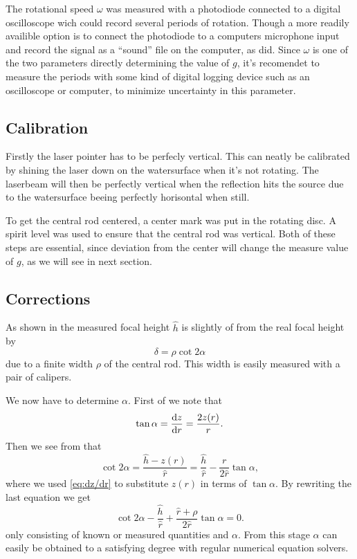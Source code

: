 \documentclass[11pt,towcolumn, swedish, english]{article}
\begin{document}
The rotational speed $\omega$ was measured with a photodiode connected
to a digital oscilloscope wich could record several periods of
rotation. Though a more readily availible option is to connect the
photodiode to a computers microphone input and record the signal as a
``sound'' file on the computer, as \cite{Sabatka2010} did. Since
$\omega$ is one of the two parameters directly determining the value
of $g$, it's recomendet to measure the periods with some kind of
digital logging device such as an oscilloscope or computer, to
minimize uncertainty in this parameter.


\subsection{Calibration}
Firstly the laser pointer has to be perfecly vertical. This can neatly be
calibrated by shining the laser down on the watersurface when it's not
rotating. The laserbeam will then be perfectly vertical when the
reflection hits the source due to the watersurface beeing perfectly
horisontal when still.

To get the central rod centered, a center mark was put in the rotating
disc. A spirit level was used to ensure that the central rod was
vertical. Both of these steps are essential, since deviation from the
center will change the measure value of $g$, as we will see in next
section. 


\subsection{Corrections}\label{sec:corrections}
As shown in  the measured focal height
$\hat{h}$ is slightly of from the real focal height by 
\begin{equation}%
\delta=\rho\cot 2\alpha
\end{equation}
due to a finite width $\rho$ of the central rod. This width is easily
measured with a pair of calipers.

We now have to determine $\alpha$. First of we note that
\begin{equation}\label{eq:dz/dr}
\tan\alpha=\dv{z}{r} =\frac{2 z(r)}{r}.
\end{equation}
Then we see from  that 
\begin{equation}
\cot 2\alpha =\frac{\hat{h} - z(r)}{\hat{r}} 
= \frac{\hat{h}}{\hat{r}}-\frac{r}{2\hat{r}}\tan\alpha,
\end{equation}
where we used \eqref{eq:dz/dr} to substitute $z(r)$ in terms of
$\tan\alpha$. By rewriting the last equation we get
\begin{equation}
\cot 2\alpha 
-\frac{\hat{h}}{\hat{r}}
+\frac{\hat{r}+\rho}{2\hat{r}}\tan\alpha  = 0.
\end{equation}
only consisting of known or measured quantities and $\alpha$. From
this stage $\alpha$ can easily be obtained to a satisfying degree with
regular numerical equation solvers.
\end{document}
